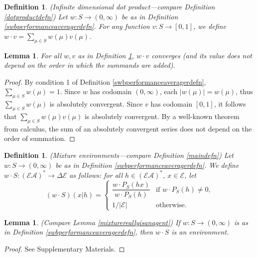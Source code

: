 \documentclass[twoside]{article}
\newtheorem{definition}[theorem]{Definition}
\newtheorem{lemma}[theorem]{Lemma}
\begin{document}
\begin{definition}
\label{infinitedimdotproductdefn}
    (Infinite dimensional dot product---compare Definition \ref{dotproductdefn})
    Let $w:S\to(0,\infty)$ be as in Definition \ref{swbperformanceaveragerdefn}.
    For any function $v:S\to[0,1]$,
    we define $w\cdot v=\sum_{\mu\in S}w(\mu)v(\mu)$.
\end{definition}

\begin{lemma}
    For all $w,v$ as in Definition \ref{infinitedimdotproductdefn},
    $w\cdot v$ converges (and its value does not depend on the order in which
    the summands are added).
\end{lemma}

\begin{proof}
    By condition 1 of Definition \ref{swbperformanceaveragerdefn},
    $\sum_{\mu\in S}w(\mu)=1$.
    Since $w$ has codomain $(0,\infty)$, each $|w(\mu)|=w(\mu)$,
    thus $\sum_{\mu\in S}w(\mu)$
    is absolutely convergent.
    Since $v$ has codomain $[0,1]$, it follows that
    $\sum_{\mu\in S}w(\mu)v(\mu)$ is absolutely convergent.
    By a well-known theorem from calculus, the sum of an absolutely
    convergent series does not depend on the order of summation.
\end{proof}

\begin{definition}
\label{mixtureenvdefn}
    (Mixture environments---compare Definition \ref{maindefn})
    Let $w:S\to(0,\infty)$ be as in Definition \ref{swbperformanceaveragerdefn}.
    We define $w\cdot S:(\mathcal E\mathcal A)^*\to\Delta\mathcal E$ as follows:
    for all $h\in (\mathcal E\mathcal A)^*$, $x\in\mathcal E$, let
    \[
        (w\cdot S)(x|h)
        =
        \begin{cases}
            \dfrac{w\cdot P_{S}(hx)}{w\cdot P_{S}(h)}
            &\mbox{if $w\cdot P_{S}(h)\not=0$,}\\
            1/|\mathcal E| &\mbox{otherwise.}
        \end{cases}
    \]
\end{definition}

\begin{lemma}
\label{wcdotSisenvlemma}
    (Compare Lemma \ref{mixturereallyisanagent})
    If $w:S\to(0,\infty)$ is as in Definition \ref{swbperformanceaveragerdefn},
    then $w\cdot S$ is an environment.
\end{lemma}

\begin{proof}
    See Supplementary Materials.
\end{proof}
\end{document}
